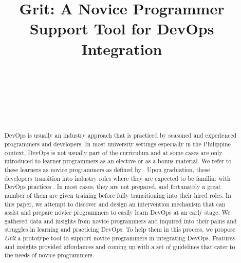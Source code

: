 \documentclass{sigchi}
\def\plaintitle{Grit: A Novice Programmer Support Tool for DevOps Integration}
\begin{document}
\title{\plaintitle}

\author{%
  \\
  \\
 \\
\\
\\
}

\maketitle

\begin{abstract}
DevOps is usually an industry approach that is practiced by seasoned and experienced programmers and developers. In most university settings especially in the Philippine context, DevOps is not usually part of the curriculum and at some cases are only introduced to learner programmers as an elective or as a bonus material. We refer to these learners as novice programmers as defined by \cite{mccarthygame}. Upon graduation, these developers transition into industry roles where they are expected to be familiar with DevOps practices \cite{scaffidi2018employers}. In most cases, they are not prepared, and fortunately a great number of them are given training before fully transitioning into their hired roles. In this paper, we attempt to discover and design an intervention mechanism that can assist and prepare novice programmers to easily learn DevOps at an early stage. We gathered data and insights from novice programmers and inquired into their pains and struggles in learning and practicing DevOps. To help them in this process, we propose \textit{Grit} a prototype tool to support novice programmers in integrating DevOps. Features and insights provided affordances and coming up with a set of guidelines that cater to the needs of novice programmers. 
\end{abstract}
\end{document}
